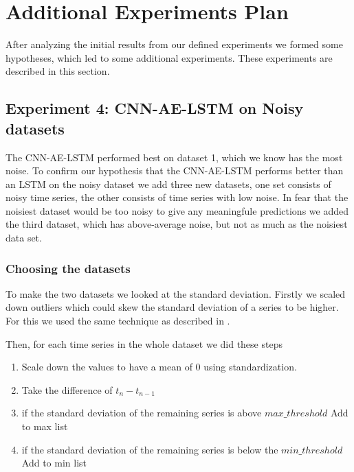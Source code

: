 \section{Additional Experiments Plan}
\label{section:Results:AdditionalExperimentalPlan}
After analyzing the initial results from our defined experiments
we formed some hypotheses, which led to some additional experiments.
These experiments are described in this section.

\subsection{Experiment 4: CNN-AE-LSTM on Noisy datasets}
\label{section:results:additional-experimental-plan:Experiment-4}
The CNN-AE-LSTM performed best on dataset 1, which we know
has the most noise. To confirm our hypothesis
that the CNN-AE-LSTM performs better than an LSTM
on the noisy dataset we add three new datasets,
one set consists of noisy time series,
the other consists of time series with low noise.
In fear that the noisiest dataset would be too noisy to give any meaningfule
predictions we added the third dataset, which has above-average noise, but not
as much as the noisiest data set.


\subsubsection{Choosing the datasets}
To make the two datasets we looked at the standard deviation.
Firstly we scaled down outliers which could skew the standard deviation of
a series to be higher. For this we used the same technique
as described in .

Then, for each time series in the whole dataset we did these steps
\begin{enumerate}
  \item Scale down the values to have a mean of 0 using standardization.
  \item Take the difference of $t_n - t_{n-1}$
  \item if the standard deviation of the remaining series is above $max\_threshold$ \-\> Add to max list
  \item if the standard deviation of the remaining series is below the $min\_threshold$ \-\> Add to min list
\end{enumerate}

